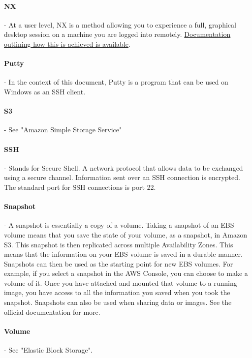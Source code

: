 \paragraph{NX} - At a user level, NX is a method allowing you to experience a full, graphical desktop session on a machine you are logged into remotely. \href{http://en.wikipedia.org/wiki/NX_technology}{Documentation outlining how this is achieved is available}.

\paragraph{Putty} - In the context of this document, Putty is a program that can be used on Windows as an SSH client.

\paragraph{S3} - See "Amazon Simple Storage Service"   

\paragraph{SSH} - Stands for Secure Shell. A network protocol that allows data to be exchanged using a secure channel. Information sent over an SSH connection is encrypted. The standard port for SSH connections is port 22.

\paragraph{Snapshot} - A snapshot is essentially a copy of a volume. Taking a snapshot of an EBS volume means that you save the state of your volume, as a snapshot, in Amazon S3. This snapshot is then replicated across multiple Availability Zones. This means that the information on your EBS volume is saved in a durable manner. Snapshots can then be used as the starting point for new EBS volumes. For example, if you select a snapshot in the AWS Console, you can choose to make a volume of it. Once you have attached and mounted that volume to a running image, you have access to all the information you saved when you took the snapshot. Snapshots can also be used when sharing data or images. See the official documentation for more. 

\paragraph{Volume} - See "Elastic Block Storage".




